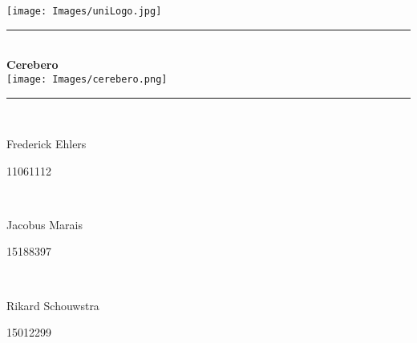 \begin{titlepage}
	
	\begin{center}
		\texttt{[image: Images/uniLogo.jpg]}\\
		\rule{\linewidth}{0.5mm} \\[0.5cm]
		{ \huge \bfseries Cerebero}\\[0.3cm]
		\texttt{[image: Images/cerebero.png]}\\
		\rule{\linewidth}{0.6mm} \\[0.5cm] 		
  
		
		\begin{minipage}{0.4\textwidth}
			\begin{flushleft} \large
				Frederick Ehlers 
			\end{flushleft}
		\end{minipage}
		\begin{minipage}{0.4\textwidth}
			\begin{flushright} \large
				11061112
			\end{flushright}
		\end{minipage} \\[0.2cm]

		\begin{minipage}{0.4\textwidth}
			\begin{flushleft} \large
				 Jacobus Marais
			\end{flushleft}
		\end{minipage}
		\begin{minipage}{0.4\textwidth}
			\begin{flushright} \large
				15188397 
			\end{flushright}
		\end{minipage}\\[0.2cm]

		\begin{minipage}{0.4\textwidth}
			\begin{flushleft} \large
				Rikard Schouwstra
			\end{flushleft}
		\end{minipage}
		\begin{minipage}{0.4\textwidth}
			\begin{flushright} \large
				15012299
			\end{flushright}
		\end{minipage} \\[0.2cm]
		

\end{center}
\end{titlepage}

